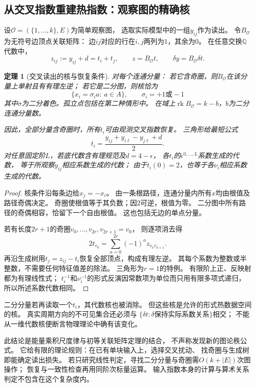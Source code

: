 \documentclass[11pt,a4paper]{ctexart}
\theoremstyle{cnplain}\newtheorem{theorem}{定理}[section]
\theoremstyle{definition}\newtheorem{definition}[theorem]{定义}
\theoremstyle{remark}\newtheorem{remark}[theorem]{注}
\newcommand{\Q}{\mathbb Q}\newcommand{\cC}{\mathcal C}
\newcommand{\rk}{\operatorname{rk}}\newcommand{\im}{\operatorname{im}}
\begin{document}
\subsection{从交叉指数重建热指数：观察图的精确核}

设$\mathcal O=(\{1,\ldots,k\},E)$为简单观察图，
选取实际模型中的一组$y_{ij}$作为读出。
令$B_{\mathcal O}$为无符号边顶点关联矩阵：
边$ij$对应的行在$i,j$两列为$1$，其余为$0$。
在任意交换$\Q$代数中，
\[
 z_{ij}:=y_{ij}+d=t_i+t_j,\qquad
 z=B_{\mathcal O}t,\qquad \delta y=B_{\mathcal O}\delta t.
                                                               \tag{PC9}\label{eq:observationmatrix}
\]

\begin{theorem}[交叉读出的核与恢复条件]\label{thm:oddcritical}
对每个连通分量：
若它含奇圈，则$B_{\mathcal O}$在该分量上单射且有有理左逆；
若它是二分图，则核恰为
\[
 \{x_i=\sigma_i a:\ a\in A\},\qquad
 \sigma_i=+1\text{或}-1
\]
其中$\sigma$为二分着色。孤立点包括在第二种情形中。
在域上$\rk B_{\mathcal O}=k-b$，$b$为二分连通分量数。

因此，全部分量含奇圈时，所有$t_i$可由观测交叉指数恢复。
三角形给最短公式
\[
 t_i=\frac{y_{ij}+y_{i\ell}-y_{j\ell}+d}{2}.          \tag{PC10}\label{eq:trianglethermal}
\]
对任意固定阶$L$，若底代数含有理规范及$d=4-\epsilon$，
各$t_i$的$\epsilon^{0,\ldots,L}$系数生成的代数，
等于所观察$y_{ij}$相应系数生成的代数；
由于$t_i(0)=2$，也等于各$\nu_i$相应系数生成的代数。
\end{theorem}
\begin{proof}
核条件沿每条边给$x_j=-x_i$。
由一条根路径，连通分量内所有$x$均由根值及路径奇偶决定。
奇圈使根值等于其负数；因$2$可逆，根值为零。
二分图中所有路径的奇偶相容，恰留下一个自由根值。
这也包括无边的单点分量。

若有长度$2r+1$的奇圈$v_0,\ldots,v_{2r},v_{2r+1}=v_0$，
则逐项消去得
\[
 2t_{v_0}=\sum_{a=0}^{2r}(-1)^a z_{v_av_{a+1}}.
\]
再沿生成树用$t_j=z_{ij}-t_i$恢复全部顶点，构成有理左逆。
其每个系数为整数或半整数，不需要任何特征值差的除法。
三角形为$r=1$的特例。
有限阶上正、反映射都为有理线性式；
$t_i^{-1}$和$\nu_i^{-1}$的形式反演因常数项为单位而只用有限多项式递归，
所以所述系数代数相同。
\end{proof}

二分分量若再读取一个$t_i$，其代数核也被消除。
但这些核是允许的形式热数据空间的核。
真实周期方向的不可见集合还必须与
$\{\delta t:\delta\text{保持实际系数关系}\}$相交；
不能从一维代数核便断言物理理论中确有该变化。

此结论是能量乘积尺度律与初等关联矩阵定理的结合，
不声称发现新的图论秩公式。
它给有限的理论规则：在已有单块输入上，选择交叉扰动、
找奇圈与生成树即能确定读出损失。
若只研究线性判定，寻找二分分量与奇圈需$O(k+|E|)$次图操作；
恢复与一致性检查再用同阶次标量运算。
输入指数本身的计算与算术关系判定不包含在这个复杂度内。
\end{document}
